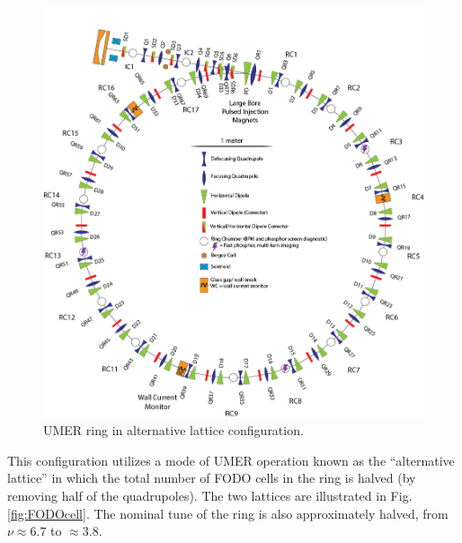 \begin{figure}[]
   \centering
   \includegraphics[width=\textwidth]{umer-diagram/altlat_full_ring.png}
   \caption{UMER ring in alternative lattice configuration.}
   \label{fig:altlatring}
\end{figure}

This configuration utilizes a mode of UMER operation known as the “alternative lattice” in which the total number of FODO cells in the ring is halved (by removing half of the quadrupoles).  The two lattices are illustrated in Fig. \ref{fig:FODOcell}. The nominal tune of the ring is also approximately halved, from $\nu \approx 6.7$ to $\approx 3.8$.






